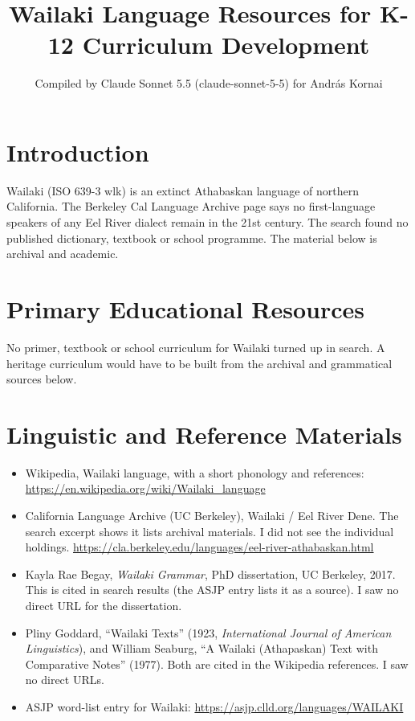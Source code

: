 \documentclass[12pt]{article}
\title{Wailaki Language Resources for K-12 Curriculum Development}
\author{Compiled by Claude Sonnet 5.5 (claude-sonnet-5-5) for Andr\'as Kornai}
\date{}
\begin{document}
\maketitle

\section{Introduction}
Wailaki (ISO 639-3 wlk) is an extinct Athabaskan language of northern California. The Berkeley Cal Language Archive page says no first-language speakers of any Eel River dialect remain in the 21st century. The search found no published dictionary, textbook or school programme. The material below is archival and academic.

\section{Primary Educational Resources}
No primer, textbook or school curriculum for Wailaki turned up in search. A heritage curriculum would have to be built from the archival and grammatical sources below.

\section{Linguistic and Reference Materials}
\begin{itemize}
\item Wikipedia, Wailaki language, with a short phonology and references: \url{https://en.wikipedia.org/wiki/Wailaki_language}
\item California Language Archive (UC Berkeley), Wailaki / Eel River Dene. The search excerpt shows it lists archival materials. I did not see the individual holdings. \url{https://cla.berkeley.edu/languages/eel-river-athabaskan.html}
\item Kayla Rae Begay, \emph{Wailaki Grammar}, PhD dissertation, UC Berkeley, 2017. This is cited in search results (the ASJP entry lists it as a source). I saw no direct URL for the dissertation.
\item Pliny Goddard, ``Wailaki Texts'' (1923, \emph{International Journal of American Linguistics}), and William Seaburg, ``A Wailaki (Athapaskan) Text with Comparative Notes'' (1977). Both are cited in the Wikipedia references. I saw no direct URLs.
\item ASJP word-list entry for Wailaki: \url{https://asjp.clld.org/languages/WAILAKI}
\end{itemize}
\end{document}
